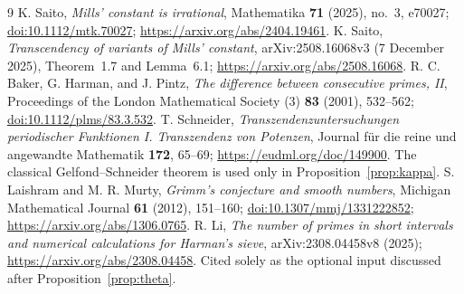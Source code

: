 \documentclass[11pt,a4paper]{article}
\theoremstyle{definition}\newtheorem{definition}[theorem]{Definition}
\theoremstyle{remark}\newtheorem{remark}[theorem]{Remark}
\begin{document}
\begin{thebibliography}{9}
 K. Saito, \emph{Mills' constant is irrational}, Mathematika \textbf{71} (2025), no.~3, e70027; \href{https://doi.org/10.1112/mtk.70027}{doi:10.1112/mtk.70027}; \url{https://arxiv.org/abs/2404.19461}.
 K. Saito, \emph{Transcendency of variants of Mills' constant}, arXiv:2508.16068v3 (7 December 2025), Theorem~1.7 and Lemma~6.1; \url{https://arxiv.org/abs/2508.16068}.
 R. C. Baker, G. Harman, and J. Pintz, \emph{The difference between consecutive primes, II}, Proceedings of the London Mathematical Society (3) \textbf{83} (2001), 532--562; \href{https://doi.org/10.1112/plms/83.3.532}{doi:10.1112/plms/83.3.532}.
 T. Schneider, \emph{Transzendenzuntersuchungen periodischer Funktionen I. Transzendenz von Potenzen}, Journal f\"ur die reine und angewandte Mathematik \textbf{172}, 65--69; \url{https://eudml.org/doc/149900}. The classical Gelfond--Schneider theorem is used only in Proposition~\ref{prop:kappa}.
 S. Laishram and M. R. Murty, \emph{Grimm's conjecture and smooth numbers}, Michigan Mathematical Journal \textbf{61} (2012), 151--160; \href{https://doi.org/10.1307/mmj/1331222852}{doi:10.1307/mmj/1331222852}; \url{https://arxiv.org/abs/1306.0765}.
 R. Li, \emph{The number of primes in short intervals and numerical calculations for Harman's sieve}, arXiv:2308.04458v8 (2025); \url{https://arxiv.org/abs/2308.04458}. Cited solely as the optional input discussed after Proposition~\ref{prop:theta}.
\end{thebibliography}
\end{document}
